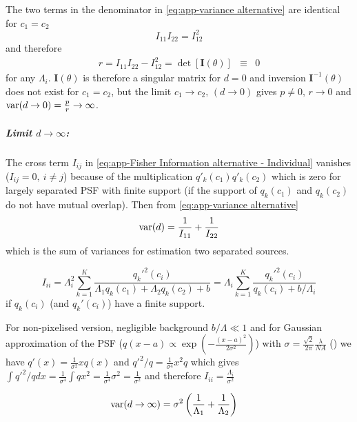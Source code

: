 The two terms in the denominator in \autoref{eq:app-variance alternative} are identical for $c_1=c_2$
\begin{equation}
	I_{11}I_{22}=I_{12}^2
\end{equation}
%
and therefore 
%
\begin{eqnarray*}
	r=I_{11}I_{22}-I_{12}^2=\det\left[\bm{I}(\theta)\right] & \equiv & 0
\end{eqnarray*}
%
for any $\Lambda_i$. $\bm{I}(\theta)$ is therefore a singular matrix for $d=0$ and inversion $\bm{I}^{-1}(\theta)$ does not exist for $c_1=c_2$, but the limit $c_1\rightarrow c_2,\,(d\rightarrow0)$ gives $p\neq0,\, r\rightarrow0$ and $\mathrm{var}(d\rightarrow0)=\frac{p}{r}\rightarrow\infty$. 

\subparagraph*{Limit $d\rightarrow\infty$:}
The cross term $I_{ij}$ in \autoref{eq:app-Fisher Information alternative - Individual} vanishes ($I_{ij}=0,\: i\neq j$) because of the multiplication $q'_k(c_1)q'_k(c_2)$ which is zero for largely separated PSF with finite support (if the support of $q_k(c_1)$ and $q_k(c_2)$ do not have mutual overlap). Then from \autoref{eq:app-variance alternative} 
%
\begin{equation}
	\mathrm{var}(d)=\frac{1}{I_{11}}+\frac{1}{I_{22}}
\end{equation}
%
which is the sum of variances for estimation two separated sources.

\begin{equation}
	I_{ii}=\Lambda_i^2\sum_{k=1}^K\frac{q_k'^2(c_i)}{\Lambda_1q_k(c_1)+\Lambda_2q_k(c_2)+b}=\Lambda_i\sum_{k=1}^K\frac{q_k'^2(c_i)}{q_k(c_i)+b/\Lambda_i}
\end{equation}
%
if $q_k(c_i)$ (and $q_k'(c_i)$) have a finite support.

For non-pixelised version, negligible background $b/\Lambda\ll1$ and for Gaussian approximation of the PSF ($q(x-a)\propto\exp\left(-\frac{(x-a)^2}{2\sigma^2}\right)$) with
$\sigma=\frac{\sqrt{2}}{2\pi}\frac{\lambda}{NA}$ (\cite{Zhang2007}) we have $q'(x)=\frac{1}{\sigma^2}xq(x)$ and $q'^2/q=\frac{1}{\sigma^4}x^2q$ which gives $\int q'^2/qdx=\frac{1}{\sigma^4}\int qx^2=\frac{1}{\sigma^4}\sigma^2=\frac{1}{\sigma^2}$ and therefore $I_{ii}=\frac{\Lambda_i}{\sigma^2}$ 

\begin{alignat*}{1}
	\mathrm{var}(d\rightarrow\infty) & =\sigma^2\left(\frac{1}{\Lambda_1}+\frac{1}{\Lambda_2}\right)
\end{alignat*}

